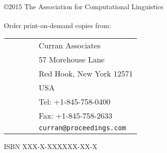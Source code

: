 \documentclass[11pt]{article}
\begin{document}
%
%

\vspace*{3.5in}
\large
\noindent
\copyright 2015 The Association for Computational Linguistics\\
\hspace*{6.5mm} \\

\vspace*{0.6in}
\noindent Order print-on-demand copies from: \\
\vspace*{3mm}

\begin{tabular}{ll}
\ \ \ \ \ \ & Curran Associates \\
& 57 Morehouse Lane \\
& Red Hook, New York 12571 \\
& USA \\
& Tel: +1-845-758-0400 \\
& Fax: +1-845-758-2633 \\
& {\tt curran@proceedings.com} \\
\end{tabular}

\vspace*{6mm}
\noindent ISBN XXX-X-XXXXXX-XX-X\\
\end{document}
